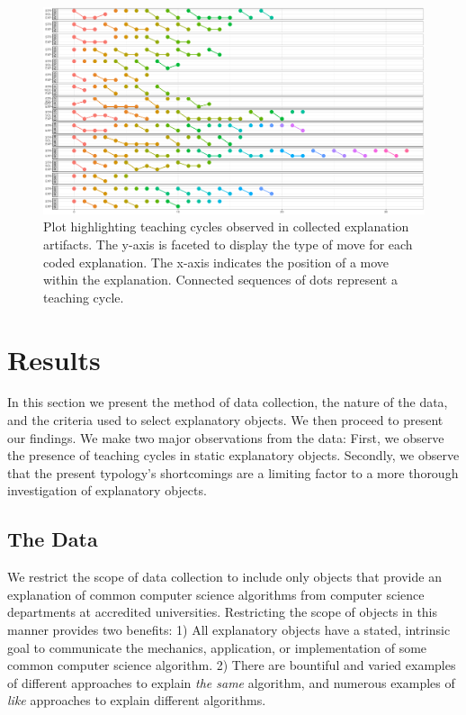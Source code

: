 \documentclass[conference]{IEEEtran}
\begin{document}
\begin{figure}
\centering
\includegraphics[width=\textwidth]{teachCyclesPlt}
\caption{Plot highlighting teaching cycles observed in collected explanation
artifacts. The y-axis is faceted to display the type of move for each coded
explanation. The x-axis indicates the position of a move within the
explanation. Connected sequences of dots represent a teaching cycle.}
\label{fig:cycles-plot}
\end{figure}

\section{Results}
In this section we present the method of data collection, the nature of the
data, and the criteria used to select explanatory objects. We then proceed to
present our findings. We make two major observations from the data: First,
we observe the presence of teaching cycles in static explanatory objects.
Secondly, we observe that the present typology's shortcomings are a limiting
factor to a more thorough investigation of explanatory objects.

\subsection{The Data}
We restrict the scope of data collection to include only objects that provide an
explanation of common computer science algorithms from computer
science departments at accredited universities. Restricting the scope of objects
in this manner provides two benefits: 1) All explanatory objects have a stated,
intrinsic goal to communicate the mechanics, application, or implementation of
some common computer science algorithm. 2) There are bountiful and varied
examples of different approaches to explain \emph{the same} algorithm, and numerous
examples of \emph{like} approaches to explain different algorithms.
\end{document}
